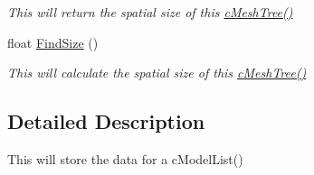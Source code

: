 \begin{DoxyCompactItemize}
\begin{DoxyCompactList}\small\item\em This will return the spatial size of this \hyperlink{classc_mesh_tree_a5847e3ca4f4f2531c6b0df1cd2c7a783}{cMeshTree()} \end{DoxyCompactList}\item 
\hypertarget{classc_mesh_tree_a66008bdef8db37c172502b0c7de87e31}{
float \hyperlink{classc_mesh_tree_a66008bdef8db37c172502b0c7de87e31}{FindSize} ()}
\label{classc_mesh_tree_a66008bdef8db37c172502b0c7de87e31}

\begin{DoxyCompactList}\small\item\em This will calculate the spatial size of this \hyperlink{classc_mesh_tree_a5847e3ca4f4f2531c6b0df1cd2c7a783}{cMeshTree()} \end{DoxyCompactList}\end{DoxyCompactItemize}


\subsection{Detailed Description}
This will store the data for a cModelList() 